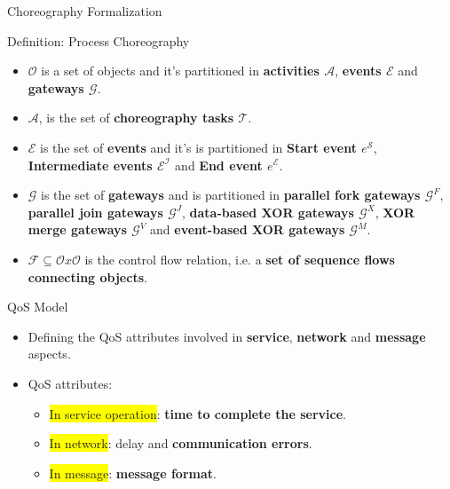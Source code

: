 \documentclass[xcolor=svgnames]{beamer}
\begin{document}
  \begin{frame}{Choreography Formalization}
    \begin{block}{ Definition: Process Choreography }\vspace{-.3\baselineskip}

      \begin{itemize}
	  \item <2->\textbf{$\mathcal{O}$} is a set of objects and it's partitioned in \textbf{activities $\mathcal{A}$}, \textbf{events $\mathcal{E}$} and \textbf{gateways $\mathcal{G}$}.
	  \item <3-> \textbf{$\mathcal{A}$}, is the set of \textbf{choreography tasks $\mathcal{T}$}.
	  \item <4-> \textbf{$\mathcal{E}$} is the set of \textbf{events} and  it's is partitioned in \textbf{Start event {$e^\mathcal{S}$}}, \textbf{Intermediate
	events $\mathcal{E^I}$} and \textbf{End event {$e^\mathcal{E}$}}.
	  \item <5-> \textbf{$\mathcal{G}$} is the set of \textbf{gateways} and is partitioned in \textbf{parallel fork gateways $\mathcal{G}^F$},
	\textbf{parallel join gateways $\mathcal{G}^J$}, \textbf{data-based XOR gateways $\mathcal{G}^X$}, \textbf{XOR merge gateways $\mathcal{G}^V$} and \textbf{event-based
	XOR gateways $\mathcal{G}^M$}.
	\item <6-> \textbf{$\mathcal{F} \subseteq \mathcal{O}x\mathcal{O}$} is the control flow relation, i.e. a \textbf{set of sequence flows connecting objects}.
      \end{itemize}

    \end{block}

  \end{frame}


  \begin{frame}{QoS Model}
    \begin{itemize} %
	\item Defining the QoS attributes involved in \textbf{service}, \textbf{network} and \textbf{message} aspects.
	\item QoS attributes:
	    \begin{itemize}
	      \item <2->\colorbox{yellow}{In service operation}: \textbf{time to complete the service}.
	      \item <3->\colorbox{yellow}{In network}: delay and \textbf{communication errors}.
	      \item <4->\colorbox{yellow}{In message}: \textbf{message format}.
	    \end{itemize}
    \end{itemize}
  \end{frame}
\end{document}
